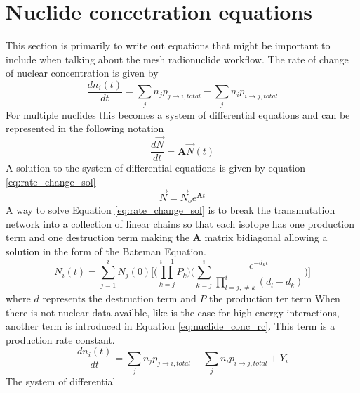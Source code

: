 \section{Nuclide concetration equations}
This section is primarily to write out equations that might be
important to include when talking about the mesh radionuclide
workflow. 
The rate of change of nuclear concentration is given by
\begin{equation}\label{eq:nuclide_conc_rc}
    \frac{dn_{i}(t)}{dt} = \sum_{j} n_{j}p_{j \rightarrow i, total}
    - \sum_{j} n_{i}p_{i \rightarrow j, total}
\end{equation}
For multiple nuclides this becomes a system of differential equations and
can be represented in the following notation
\begin{equation}\label{eq:nuclide_conc_rc_vec}
  \frac{d\vec{N}}{dt} =\boldsymbol{A}  \vec{N}(t)
\end{equation}
A solution to the system of differential equations is given by equation \ref{eq:rate_change_sol}
\begin{equation}\label{eq:rate_change_sol}
  \vec{N} =\vec{N}_{o} e^{\boldsymbol{A}t}
\end{equation}
A way to solve Equation \ref{eq:rate_change_sol} is to break the transmutation network
into a collection of linear chains so that each isotope has one production term and
one destruction term making the $\boldsymbol{A}$ matrix bidiagonal allowing a solution
in the form of the Bateman Equation.
\begin{equation}\label{eq:bateman}
  N_{i}(t) = \sum_{j=1}^{i} N_{j}(0)
  \Bigg[ \Bigg( \prod_{k=j}^{i-1} P_{k} \Bigg)
  \Bigg(\sum_{k=j}^{i}\frac{e^{-d_{k}t}}{\prod_{l=j,\neq k}^{i}(d_{l} -d_{k})}
  \Bigg)
  \Bigg]
\end{equation}
where $d$ represents the destruction term and $P$ the production ter term
When there is not nuclear data availble, like is the case for high energy interactions,
another term is introduced in Equation \ref{eq:nuclide_conc_rc}. This term is a
production rate constant.
\begin{equation}\label{eq:nuclide_conc_rc_he}
    \frac{dn_{i}(t)}{dt} = \sum_{j} n_{j}p_{j \rightarrow i, total}
    - \sum_{j} n_{i}p_{i \rightarrow j, total} + Y_{i}
\end{equation}
The system of differential

